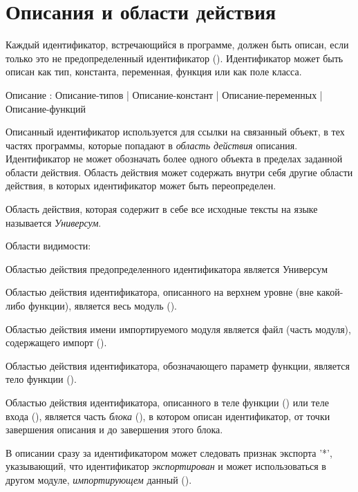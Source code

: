 \hypertarget{decls}{%
\section{Описания и области действия}\label{decls:chapter}}

Каждый идентификатор, встречающийся в программе, должен быть описан, если только это
не предопределенный идентификатор (). Идентификатор может быть описан как тип, константа, переменная, функция или как поле класса.

\begin{Grammar}
Описание
	: Описание-типов
	| Описание-констант
	| Описание-переменных
	| Описание-функций
\end{Grammar} 

Описанный идентификатор используется для ссылки на связанный объект, в тех частях программы, которые попадают в \emph{область действия} описания. 
Идентификатор не может обозначать более одного объекта в пределах заданной области действия. 
Область действия может содержать внутри себя другие области действия, в которых идентификатор может быть переопределен.

Область действия, которая содержит в себе все исходные тексты на языке \thelang{} называется \emph{Универсум}.

Области видимости:
\begin{d_itemize}
\item
Областью действия предопределенного идентификатора является Универсум
\item
Областью действия идентификатора, описанного на верхнем уровне (вне какой-либо функции), является весь модуль ().
\item
Областью действия имени импортируемого модуля является файл (часть модуля), содержащего импорт ().
\item
Областью действия идентификатора, обозначающего параметр функции, является тело функции ().
\item
Областью действия идентификатора, описанного в теле функции () или теле входа (), является часть \emph{блока} (), в котором описан идентификатор, от точки завершения описания и до завершения этого блока. 
\end{d_itemize}

В описании сразу за идентификатором может следовать признак экспорта '*', указывающий, что идентификатор \emph{экспортирован} и может использоваться в другом модуле, \emph{импортирующем} данный (). 

